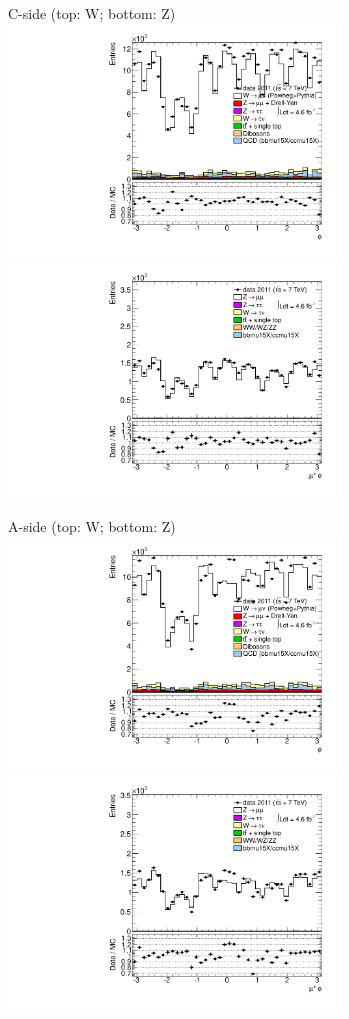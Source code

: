 {

\colb[T]

C-side (top: W; bottom: Z)
\centering
\includegraphics[width=0.66\textwidth]{dates/20130306/figures/etaphi/W_3_C_stack_l_phi_POS} \\
\includegraphics[width=0.66\textwidth]{dates/20130306/figures/etaphi/Z_3_C_stack_lP_phi_ALL.pdf}

A-side (top: W; bottom: Z)
\centering
\includegraphics[width=0.66\textwidth]{dates/20130306/figures/etaphi/W_3_A_stack_l_phi_POS} \\
\includegraphics[width=0.66\textwidth]{dates/20130306/figures/etaphi/Z_3_A_stack_lP_phi_ALL.pdf} 

\cole
}


